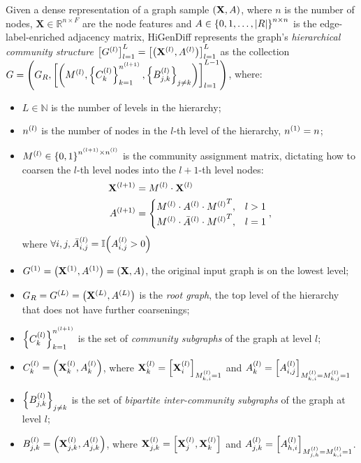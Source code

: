 Given a dense representation of a graph sample $\of{\mathbf{X},A}$, where $n$ is the number of nodes, $\mathbf{X} \in \mathbb{R}^{n \times F}$ are the node features and $A \in \offf{0,1,\dots,\abs{R}}^{n \times n}$ is the edge-label-enriched adjacency matrix, HiGenDiff represents the graph's \emph{hierarchical community structure} $\off{G^{\of{l}}}_{l=1}^{L}=\off{\of{\mathbf{X}^{\of{l}},A^{\of{l}}}}_{l=1}^{L}$ as the collection $G=\of{G_R,\off{\of{M^{\of{l}}, \offf{C^{\of{l}}_{k}}_{k=1}^{n^{\of{l+1}}},\offf{B^{\of{l}}_{j,k}}_{j \neq k}}}_{l=1}^{L-1}}$, where:
\begin{itemize}
    \item $L \in \mathbb{N}$ is the number of levels in the hierarchy;
    \item $n^{\of{l}}$ is the number of nodes in the $l$-th level of the hierarchy, $n^{\of{1}}=n$;
    \item $M^{\of{l}} \in \offf{0,1}^{n^{\of{l+1}} \times n^{\of{l}}}$ is the community assignment matrix, dictating how to coarsen the $l$-th level nodes into the $l+1$-th level nodes:
    \begin{align}
        \begin{split}
            \mathbf{X}^{\of{l+1}}&=M^{\of{l}} \cdot \mathbf{X}^{\of{l}} \\
            A^{\of{l+1}}&=\begin{cases}
                M^{\of{l}} \cdot A^{\of{l}} \cdot {M^{\of{l}}}^T, & l>1 \\
                M^{\of{l}} \cdot \bar{A}^{\of{l}} \cdot {M^{\of{l}}}^T, & l=1
            \end{cases},
        \end{split}
    \end{align}
    where $\forall i,j, \bar{A}^{\of{l}}_{i,j}=\mathbb{I}\of{A^{\of{l}}_{i,j}>0}$
    \item $G^{\of{1}}=\of{\mathbf{X}^{\of{1}},A^{\of{1}}}=\of{\mathbf{X},A}$, the original input graph is on the lowest level;
    \item $G_R=G^{\of{L}}=\of{\mathbf{X}^{\of{L}}, A^{\of{L}}}$ is the \emph{root graph}, the top level of the hierarchy that does not have further coarsenings;
    \item $\offf{C^{\of{l}}_{k}}_{k=1}^{n^{\of{l+1}}}$ is the set of \emph{community subgraphs} of the graph at level $l$;
    \item $C^{\of{l}}_{k}=\of{\mathbf{X}_k^{\of{l}},A_k^{\of{l}}}$, where $\mathbf{X}_k^{\of{l}}=\off{\mathbf{X}_i^{\of{l}}}_{M^{\of{l}}_{k,i}=1}$ and $A_k^{\of{l}}=\off{A_{i,j}^{\of{l}}}_{M^{\of{l}}_{k,i}=M^{\of{l}}_{k,j}=1}$
    \item $\offf{B^{\of{l}}_{j,k}}_{j \neq k}$ is the set of \emph{bipartite inter-community subgraphs} of the graph at level $l$;
    \item $B^{\of{l}}_{j,k}=\of{\mathbf{X}_{j,k}^{\of{l}},A_{j,k}^{\of{l}}}$, where $\mathbf{X}_{j,k}^{\of{l}}=\off{\mathbf{X}_{j}^{\of{l}},\mathbf{X}_{k}^{\of{l}}}$ and $A_{j,k}^{\of{l}}=\off{A_{h,i}^{\of{l}}}_{M^{\of{l}}_{j,h}=M^{\of{l}}_{k,i}=1}$.
\end{itemize}

